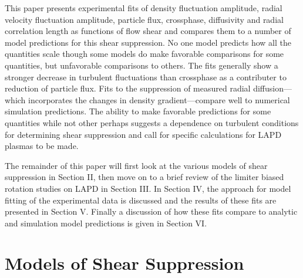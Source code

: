 \documentclass[aip,pop,amsmath,amssymb,preprint,superscriptaddress]{revtex4-1} %
\begin{document}
This paper presents experimental fits of density fluctuation amplitude, radial velocity fluctuation amplitude, particle flux, crossphase, diffusivity and radial correlation length as functions of flow shear and compares them to a number of model predictions for this shear suppression. No one model predicts how all the quantities scale though some models do make favorable comparisons for some quantities, but unfavorable comparisons to others. The fits generally show a stronger decrease in turbulent fluctuations than crossphase as a contributer to reduction of particle flux. Fits to the suppression of measured radial diffusion---which incorporates the changes in density gradient---compare well to numerical simulation predictions. The ability to make favorable predictions for some quantities while not other perhaps suggests a dependence on turbulent conditions for determining shear suppression and call for specific calculations for LAPD plasmas to be made.

The remainder of this paper will first look at the various models of shear suppression in Section II, then move on to a brief review of the limiter biased rotation studies on LAPD in Section III. In Section IV, the approach for model fitting of the experimental data is discussed and the results of these fits are presented in Section V. Finally a discussion of how these fits compare to analytic and simulation model predictions is given in Section VI.

\section{Models of Shear Suppression}
\end{document}
